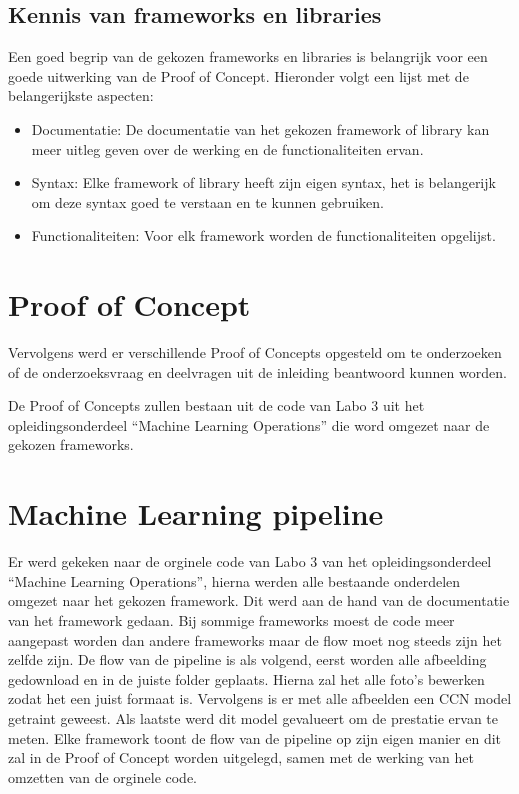 \subsection{Kennis van frameworks en libraries}
Een goed begrip van de gekozen frameworks en libraries is belangrijk voor een goede uitwerking van de Proof of Concept. Hieronder volgt een lijst met de belangerijkste aspecten:
\begin{itemize}
  \item Documentatie: De documentatie van het gekozen framework of library kan meer uitleg geven over de werking en de functionaliteiten ervan.
  \item Syntax: Elke framework of library heeft zijn eigen syntax, het is belangerijk om deze syntax goed te verstaan en te kunnen gebruiken.
  \item Functionaliteiten: Voor elk framework worden de functionaliteiten opgelijst.
\end{itemize}
\section{Proof of Concept}
Vervolgens werd er verschillende Proof of Concepts opgesteld om te onderzoeken of de onderzoeksvraag en deelvragen uit de inleiding beantwoord kunnen worden.

De Proof of Concepts zullen bestaan uit de code van Labo 3 uit het opleidingsonderdeel ``Machine Learning Operations'' die word omgezet naar de gekozen frameworks.

\section{Machine Learning pipeline}
Er werd gekeken naar de orginele code van Labo 3 van het opleidingsonderdeel ``Machine Learning Operations'', hierna werden alle bestaande onderdelen omgezet naar het gekozen framework. Dit werd aan de hand van de documentatie van het framework gedaan.
Bij sommige frameworks moest de code meer aangepast worden dan andere frameworks maar de flow moet nog steeds zijn het zelfde zijn.
De flow van de pipeline is als volgend, eerst worden alle afbeelding gedownload en in de juiste folder geplaats. Hierna zal het alle foto's bewerken zodat het een juist formaat is. Vervolgens is er met alle afbeelden een CCN model getraint geweest. Als laatste werd dit model gevalueert om de prestatie ervan te meten.
Elke framework toont de flow van de pipeline op zijn eigen manier en dit zal in de Proof of Concept worden uitgelegd, samen met de werking van het omzetten van de orginele code.
